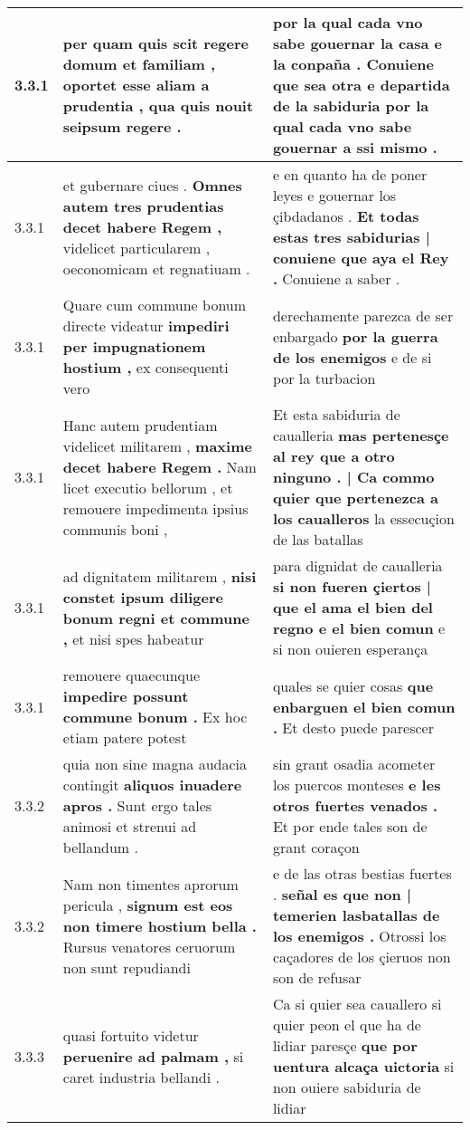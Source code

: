 \begin{tabular}{|p{1cm}|p{6.5cm}|p{6.5cm}|}
3.3.1 & per quam quis scit regere domum et familiam , \textbf{ oportet esse aliam a prudentia , } qua quis nouit seipsum regere . & por la qual cada vno sabe gouernar la casa e la conpaña . \textbf{ Conuiene que sea otra e departida de la sabiduria } por la qual cada vno sabe gouernar a ssi mismo . \\\hline
3.3.1 & et gubernare ciues . \textbf{ Omnes autem tres prudentias decet habere Regem , } videlicet particularem , oeconomicam et regnatiuam . & e en quanto ha de poner leyes e gouernar los çibdadanos . \textbf{ Et todas estas tres sabidurias | conuiene que aya el Rey . } Conuiene a saber . \\\hline
3.3.1 & Quare cum commune bonum directe videatur \textbf{ impediri per impugnationem hostium , } ex consequenti vero & derechamente parezca de ser enbargado \textbf{ por la guerra de los enemigos } e de si por la turbacion \\\hline
3.3.1 & Hanc autem prudentiam videlicet militarem , \textbf{ maxime decet habere Regem . } Nam licet executio bellorum , et remouere impedimenta ipsius communis boni , & Et esta sabiduria de caualleria \textbf{ mas pertenesçe al rey que a otro ninguno . | Ca commo quier que pertenezca a los caualleros } la essecuçion de las batallas \\\hline
3.3.1 & ad dignitatem militarem , \textbf{ nisi constet ipsum diligere bonum regni et commune , } et nisi spes habeatur & para dignidat de caualleria \textbf{ si non fueren çiertos | que el ama el bien del regno e el bien comun } e si non ouieren esperança \\\hline
3.3.1 & remouere quaecunque \textbf{ impedire possunt commune bonum . } Ex hoc etiam patere potest & quales se quier cosas \textbf{ que enbarguen el bien comun . } Et desto puede parescer \\\hline
3.3.2 & quia non sine magna audacia contingit \textbf{ aliquos inuadere apros . } Sunt ergo tales animosi et strenui ad bellandum . & sin grant osadia acometer los puercos monteses \textbf{ e les otros fuertes venados . } Et por ende tales son de grant coraçon \\\hline
3.3.2 & Nam non timentes aprorum pericula , \textbf{ signum est eos non timere hostium bella . } Rursus venatores ceruorum non sunt repudiandi & e de las otras bestias fuertes . \textbf{ señal es que non | temerien lasbatallas de los enemigos . } Otrossi los caçadores de los çieruos non son de refusar \\\hline
3.3.3 & quasi fortuito videtur \textbf{ peruenire ad palmam , } si caret industria bellandi . & Ca si quier sea cauallero si quier peon el que ha de lidiar paresçe \textbf{ que por uentura alcaça uictoria } si non ouiere sabiduria de lidiar \\\hline

\end{tabular}
